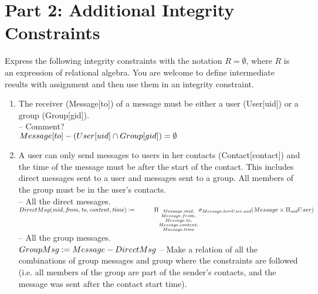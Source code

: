 \documentclass{article}
\newcommand{\var}[1]{\mathit{#1}}
\begin{document}
\section*{Part 2: Additional Integrity Constraints}


Express the following integrity constraints
with the notation $R = \emptyset$, where $R$ is an expression of relational algebra. 
You are welcome to define intermediate results with assignment
and then use them in an integrity constraint.

\begin{enumerate}

\item   %
The receiver (Message[to]) of a message must be either a user (User[uid]) or a group (Group[gid]). \\ [5pt]
\large{
\hspace*{1cm} -- Comment?\\ [5pt]
$
Message[to] - (User[uid] \cap Group[gid]) =  \emptyset \\[5pt]
$
}
\item %
A user can only send messages to users in her contacts (Contact[contact]) and the time of the message must be after the start of the contact. This includes direct messages sent to a user and messages sent to a group. All members of the group must be in the user's contacts. \\[5pt]
\large{
\hspace*{1cm} -- All the direct messages. \\ [5pt]
$
DirectMsg(\var{mid}, \var{from}, \var{to}, \var{content}, \var{time}) := \\ [5pt]
\hspace*{1cm} \Pi_{\substack{Message.mid, \\
							Message.from, \\
							Message.to, \\
							Message.content, \\
							Message.time}}
			\sigma_{Message.to = User.uid}
			(Message \times \Pi_{\var{uid}} User) \\ [5pt]
$
\hspace*{1cm} -- All the group messages. \\ [5pt]
$
GroupMsg := Message - DirectMsg \\ [5pt]
$
\hspace*{1cm} -- Make a relation of all the combinations of group messages and group where the constraints are followed (i.e. all members of the group are part of the sender's contacts, and the message was sent after the contact start time). \\ [5pt]
}
\end{enumerate}
\end{document}
